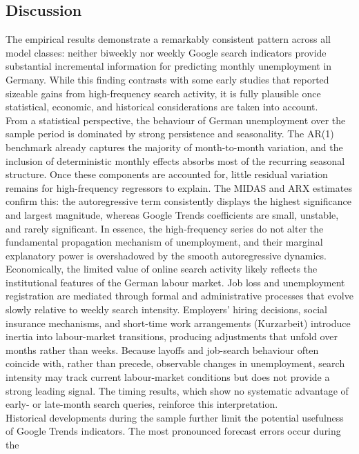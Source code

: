 \documentclass[12pt,a4paper]{article}
\begin{document}
\subsection{Discussion}
The empirical results demonstrate a remarkably consistent pattern across all
model classes: neither biweekly nor weekly Google search indicators provide
substantial incremental information for predicting monthly unemployment in
Germany. While this finding contrasts with some early studies that reported
sizeable gains from high-frequency search activity, it is fully plausible once
statistical, economic, and historical considerations are taken into account.\\
From a statistical perspective, the behaviour of German unemployment over the
sample period is dominated by strong persistence and seasonality. The AR(1)
benchmark already captures the majority of month-to-month variation, and the
inclusion of deterministic monthly effects absorbs most of the recurring seasonal
structure. Once these components are accounted for, little residual variation
remains for high-frequency regressors to explain. The MIDAS and ARX estimates
confirm this: the autoregressive term consistently displays the highest
significance and largest magnitude, whereas Google Trends coefficients are small,
unstable, and rarely significant. In essence, the high-frequency series do not
alter the fundamental propagation mechanism of unemployment, and their marginal
explanatory power is overshadowed by the smooth autoregressive dynamics.\\
Economically, the limited value of online search activity likely reflects the
institutional features of the German labour market. Job loss and unemployment
registration are mediated through formal and administrative processes that evolve
slowly relative to weekly search intensity. Employers' hiring decisions, social
insurance mechanisms, and short-time work arrangements (Kurzarbeit) introduce
inertia into labour-market transitions, producing adjustments that unfold over
months rather than weeks. Because layoffs and job-search behaviour often coincide
with, rather than precede, observable changes in unemployment, search intensity
may track current labour-market conditions but does not provide a strong leading
signal. The timing results, which show no systematic advantage of early- or
late-month search queries, reinforce this interpretation.\\
Historical developments during the sample further limit the potential usefulness
of Google Trends indicators. The most pronounced forecast errors occur during the
\end{document}

